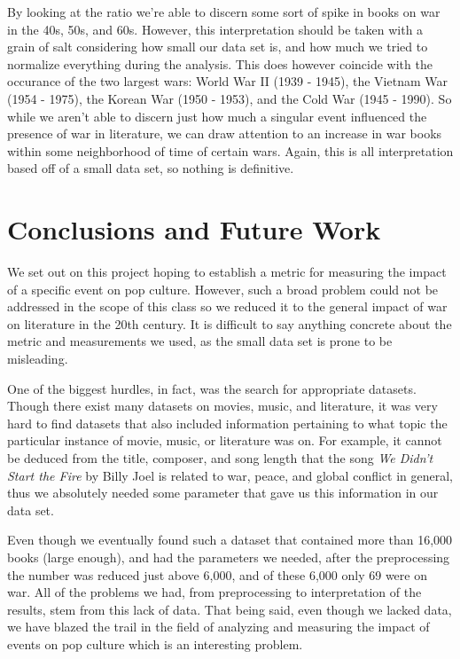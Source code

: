 \documentclass[twoside]{article}
\begin{document}
\begin{multicols}{2}
    By looking at the ratio we're able to discern some sort of spike in books on war in the 40s, 50s, and 60s. However, this interpretation should be taken with a grain of salt considering how small our data set is, and how much we tried to normalize everything during the analysis. This does however coincide with the occurance of the two largest wars: World War II (1939 - 1945), the Vietnam War (1954 - 1975), the Korean War (1950 - 1953), and the Cold War (1945 - 1990). So while we aren't able to discern just how much a singular event influenced the presence of war in literature, we can draw attention to an increase in war books within some neighborhood of time of certain wars. Again, this is all interpretation based off of a small data set, so nothing is definitive. 

\section{Conclusions and Future Work}
    We set out on this project hoping to establish a metric for measuring the impact of a specific event on pop culture. However, such a broad problem could not be addressed in the scope of this class so we reduced it to the general impact of war on literature in the 20th century. It is difficult to say anything concrete about the metric and measurements we used, as the small data set is prone to be misleading. 
    
    One of the biggest hurdles, in fact, was the search for appropriate datasets. Though there exist many datasets on movies, music, and literature, it was very hard to find datasets that also included information pertaining to what topic the particular instance of movie, music, or literature was on. For example, it cannot be deduced from the title, composer, and song length that the song \textit{We Didn't Start the Fire} by Billy Joel is related to war, peace, and global conflict in general, thus we absolutely needed some parameter that gave us this information in our data set. 
    
    Even though we eventually found such a dataset that contained more than 16,000 books (large enough), and had the parameters we needed, after the preprocessing the number was reduced just above 6,000, and of these 6,000 only 69 were on war. All of the problems we had, from preprocessing to interpretation of the results, stem from this lack of data. That being said, even though we lacked data, we have blazed the trail in the field of analyzing and measuring the impact of events on pop culture which is an interesting problem. 


\end{multicols}
\end{document}
